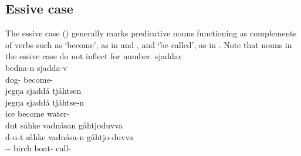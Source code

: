 \subsection{Essive case}\label{essive}
The essive case (\ESSs) generally marks predicative nouns functioning as complements of verbs such as  ‘become’, as in  and , and  ‘be called’, as in . Note that nouns in the essive case do not inflect for number. 
\ea\label{ess1a}
 sjaddav\\
	bedna-n sjadda-v\\
	dog- become-\\\nopagebreak
{} 
\z
\ea\label{ess1b}
\glll	jegŋa sjaddá {tjáhtsen}\\
	jegŋa sjaddá tjáhtse-n\\
	ice\BS{} become\BS{} water-\\\nopagebreak
{} 
\z
%
\ea\label{ess2}
\glll	dut såhke {vadnásan} gåhtjoduvva\\
	d-u-t såhke vadnása-n gåhtjo-duvva \\
	-- birch\BS{} boat- call-\\\nopagebreak
{} 
\z%

